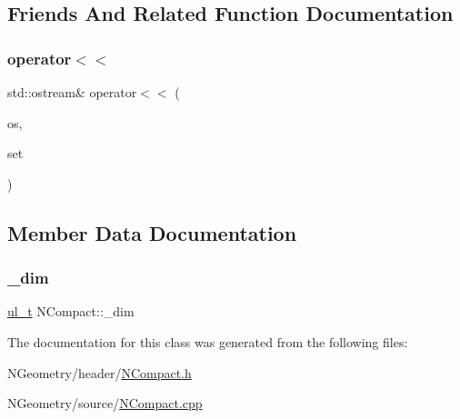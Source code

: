 \subsection{Friends And Related Function Documentation}
\mbox{\label{class_n_compact_a2afd0750c38a42e4afdc675fb8ac0221}} 
\subsubsection{\texorpdfstring{operator$<$$<$}{operator<<}}
{\footnotesize\ttfamily std\+::ostream\& operator$<$$<$ (\begin{DoxyParamCaption}\item[{std\+::ostream \&}]{os,  }\item[{const \mbox{\hyperlink{class_n_compact}{N\+Compact}} \&}]{set }\end{DoxyParamCaption})\hspace{0.3cm}{\ttfamily [friend]}}



\subsection{Member Data Documentation}
\mbox{\label{class_n_compact_a0f13086af28c4e2dbbcaa308f28ed506}} 
\subsubsection{\texorpdfstring{\_dim}{\_dim}}
{\footnotesize\ttfamily \mbox{\hyperlink{typedef_8h_a1b140a2034db3f5dfe18a987745df43a}{ul\+\_\+t}} N\+Compact\+::\+\_\+dim\hspace{0.3cm}{\ttfamily [protected]}}



The documentation for this class was generated from the following files\+:\begin{DoxyCompactItemize}
\item 
N\+Geometry/header/\mbox{\hyperlink{_n_compact_8h}{N\+Compact.\+h}}\item 
N\+Geometry/source/\mbox{\hyperlink{_n_compact_8cpp}{N\+Compact.\+cpp}}\end{DoxyCompactItemize}
